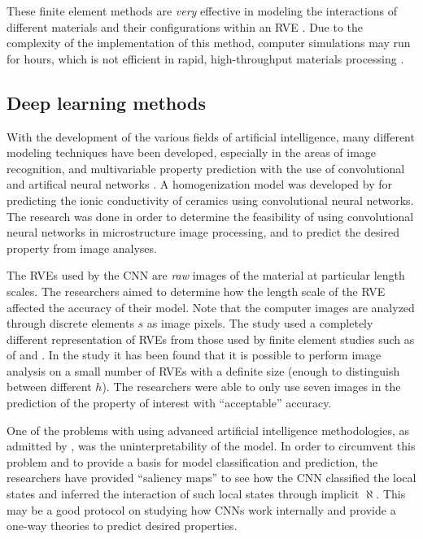These finite element methods are \emph{very} effective in modeling the interactions of different materials and their configurations within an RVE \cite{bone,cosserat}.
Due to the complexity of the implementation of this method, computer simulations may run for hours, which is not efficient in rapid, high-throughput materials processing \cite{cnn}.

\subsection{Deep learning methods}

With the development of the various fields of artificial intelligence, many different modeling techniques have been developed, especially in the areas of image recognition, and multivariable property prediction with the use of convolutional and artifical neural networks \cite{cnn}.
A homogenization model was developed by  for predicting the ionic conductivity of ceramics using convolutional neural networks.
The research was done in order to determine the feasibility of using convolutional neural networks in microstructure image processing, and to predict the desired property from image analyses.

The RVEs used by the CNN are \emph{raw} images of the material at particular length scales.
The researchers aimed to determine how the length scale of the RVE affected the accuracy of their model.
Note that the computer images are analyzed through discrete elements $s$ as image pixels.
The study used a completely different representation of RVEs from those used by finite element studies such as of  and .
In the study it has been found that it is possible to perform image analysis on a small number of RVEs with a definite size (enough to distinguish between different $h$).
The researchers were able to only use seven images in the prediction of the property of interest with ``acceptable'' accuracy.

One of the problems with using advanced artificial intelligence methodologies, as admitted by , was the uninterpretability of the model.
In order to circumvent this problem and to provide a basis for model classification and prediction, the researchers have provided ``saliency maps'' to see how the CNN classified the local states and inferred the interaction of such local states through implicit $\aleph$.
This may be a good protocol on studying how CNNs work internally and provide a one-way theories to predict desired properties.

